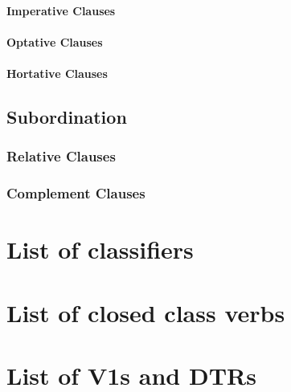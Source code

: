 \documentclass[a4paper, 12pt, oneside]{memoir}
\begin{document}
\subsubsection{Imperative Clauses}
\subsubsection{Optative Clauses}
\subsubsection{Hortative Clauses}
\section{Subordination}
\subsection{Relative Clauses}
\subsection{Complement Clauses}\label{s:complclaus}
\begin{appendices}
\chapter{List of classifiers}
\chapter{List of closed class verbs}
\chapter{List of V1s and DTRs}
\end{appendices}
\end{document}
